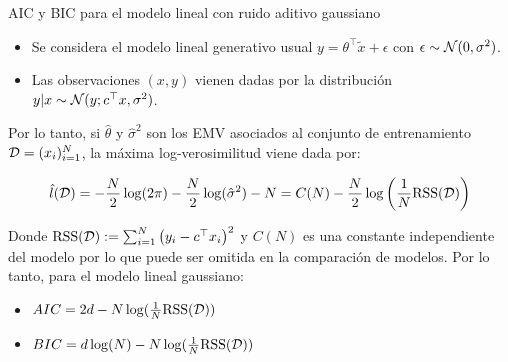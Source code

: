 \documentclass[handout, 9pt]{beamer}
\begin{document}
\begin{frame}{AIC y BIC para el modelo lineal con ruido aditivo gaussiano}

\begin{itemize}
	\item Se considera el modelo lineal generativo usual $y = \theta^\top \tilde{x} + \epsilon$ con $\epsilon\sim{\mathcal N}(0,\sigma^2)$.
	\item Las observaciones $(x,y)$ vienen dadas por la distribución  $y|x \sim {\mathcal N}(y;c^\top x,\sigma^2)$.
\end{itemize}

Por lo tanto, si $\hat{\theta}$ y $\hat{\sigma}^2$ son los EMV asociados al conjunto de entrenamiento ${\mathcal D}=(x_i)_{i=1}^N$, la máxima log-verosimilitud viene dada por:

\begin{equation*}
	\hat{l}({\mathcal D}) = -\frac{N}{2}\log(2\pi) - \frac{N}{2}\log(\hat{\sigma}^2) - N = C(N)- \frac{N}{2}\log\left(\frac{1}{N}\text{RSS}({\mathcal D})\right)
\end{equation*}	

Donde $\text{RSS}({\mathcal D}) := \sum_{i=1}^N \left(y_i - c^\top x_i\right)^2$ y $C(N)$ es una constante independiente del modelo por lo que puede ser omitida en la comparación de modelos. Por lo tanto, para el modelo lineal gaussiano:

\begin{itemize}
	\item $AIC=2d-N\log(\frac{1}{N}\text{RSS}({\mathcal D}))$
	\item $BIC = d\log(N) - N\log(\frac{1}{N}\text{RSS}({\mathcal D}))$
\end{itemize}

	
\end{frame}
\end{document}
